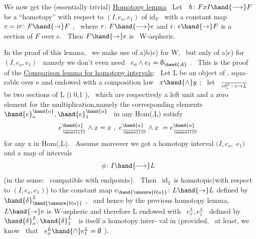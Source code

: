 
We now get the (essentially trivial)
\uline{Homotopy lemma} \ Let \ $h\colon FxI \hand{\longrightarrow} F$ be a ``homotopy'' with respect to $(I,e_o,e_1)$
of $\mathrm{id}_F$ \ with a constant map  $c = ir\colon F \hand{\to} F$ , \ where $r\colon F \hand{\longrightarrow} e$ and 
$i\colon e \hand{\to} F$ is a section of $F$ over $e$. \ Then $F \hand{\to} e$ is \ W-aspheric.

In the proof of this lemma, \ we make use of a)b)c) for W, \ but only
of a)c) for $(I,e_o,e_1)$ \ namely we don't even need \ $e_o \wedge e_1 = \emptyset_{\hand{\mathcal{A}}}$ . \ This is
  the proof of the
\uline{Comparison lemma for homotopy intervals}: \ Let L be an object of  , squa-%
rable over e and endowed with a composition law \ $x\hand{\wedge}y$ ; \ let \ $\over{e}{\delta}_i^L \colon e \to L$
be two sections of L (i \hand{$\in\{$}0,1\hand{$\}$} ), \ which are respectively a left unit and a
zero element for the multiplication,namely the corresponding elements
$\hand{e}_o^{\hand{a}},\hand{e}_1^{\hand{a}}$ \ in any Hom(,L) satisfy
\[ e_{\over{\unsure{o}}{1}}^{\hand{a}} \wedge x = x \ , \ e_{\over{\unsure{1}}{0}}^{\hand{a}} \wedge x \ = e_{\over{\unsure{1}}{0}}^{\hand{a}} \]
for any x in Hom(,L). \ Assume moreover we got a homotopy interval $(I,e_o,$
$e_1)$ and a map of intervals
\[ \phi\colon I \hand{\longrightarrow} L \]
(in the sense: \ compatible with endpoints). \ Then \ $\mathrm{id}_L$ is homotopic(with
respect to $(I,e_o,e_1)$) to the constant map $c_{\hand{\unsure{0|a}}}\colon L \hand{\to} L$ defined by $\hand{\delta}^L_{\hand{\unsure{0|a}}}$ , \ and
hence by the previous homotopy lemma, \ $L \hand{\to} e$ is W-aspheric and therefore
 L endowed with \ $e_o^L ,e_1^L$ \ defined by $\hand{\delta}_o^L,\hand{\delta}_1^L$ \ is itself a homotopy inter-%
val in  (provided, \ at least, we know \ that \ $e_o^L \hand{\cap} e_1^L = \emptyset$ ).

